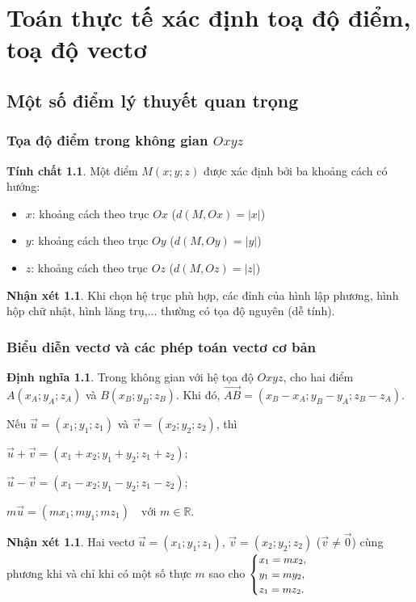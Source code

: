 \documentclass[12pt,a4paper,oneside]{book}
\theoremstyle{theorem}
\theoremstyle{definition}
\newtheorem{dn}[theorem2]{Định nghĩa}
\newtheorem{nx}[theorem2]{Nhận xét}
\newtheorem{tc}[theorem2]{Tính chất}
\begin{document}
	\fontsize{13pt}{18pt}\selectfont %
	\setlength{\baselineskip}{26truept}
	\pagestyle{empty}

    \chapter{Toán thực tế xác định toạ độ điểm, toạ độ vectơ}
    \section{Một số điểm lý thuyết quan trọng}
    \subsection{Tọa độ điểm trong không gian $Oxyz$}
    \begin{tc}
    Một điểm $M(x;y;z)$ được xác định bởi ba khoảng cách có hướng:
        \begin{itemize}
            \item $x$: khoảng cách theo trục $Ox$ ($d(M,Ox)=|x|$)
            \item $y$: khoảng cách theo trục $Oy$ ($d(M,Oy)=|y|$)
            \item $z$: khoảng cách theo trục $Oz$ ($d(M,Oz)=|z|$)
        \end{itemize}
    \end{tc}
    \begin{nx} Khi chọn hệ trục phù hợp, các đỉnh của hình lập phương, hình hộp chữ nhật, hình lăng trụ,... thường có tọa độ nguyên (dễ tính).
    \end{nx}
    \subsection{Biểu diễn vectơ và các phép toán vectơ cơ bản}
    \begin{dn} Trong không gian với hệ tọa độ $Oxyz$, cho hai điểm
    $A(x_A;y_A;z_A)$ và $B(x_B;y_B;z_B)$. Khi đó, $\overrightarrow{AB}=(x_B-x_A;y_B-y_A;z_B-z_A).$
    
    Nếu $\vec{u}=(x_1;y_1;z_1)$ và $\vec{v}=(x_2;y_2;z_2)$, thì
    
    \hspace{4 cm} $\vec{u}+\vec{v}=(x_1+x_2;y_1+y_2;z_1+z_2);$
    
    \hspace{4 cm} $\vec{u}-\vec{v}=(x_1-x_2;y_1-y_2;z_1-z_2);$

    \hspace{4 cm} $m\vec{u}=(mx_1;my_1;mz_1) \quad \text{với } m\in\mathbb{R}.$
    \end{dn}
    \begin{nx} Hai vectơ $\vec{u}=(x_1;y_1;z_1)$,
    $\vec{v}=(x_2;y_2;z_2)$ ($\vec{v}\ne\vec{0}$) cùng phương khi và chỉ khi
    có một số thực $m$ sao cho
    $\small \begin{cases}
    x_1=mx_2,\\
    y_1=my_2,\\
    z_1=mz_2.
    \end{cases}$
    \end{nx}
\end{document}
